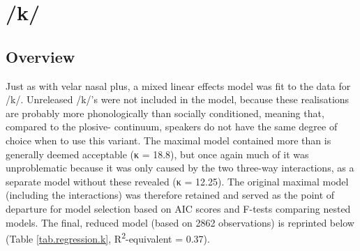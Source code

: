 \section{/k/}
\label{prod.res.con.k}

\subsection{Overview}
\label{sec.prod.res.con.k.overview}

Just as with velar nasal plus, a mixed linear effects model was fit to the data for /k/.
Unreleased /k/'s were not included in the model, because these realisations are probably more phonologically than socially conditioned, meaning that, compared to the plosive- continuum, speakers do not have the same degree of choice when to use this variant.
The maximal model contained more  than is generally deemed acceptable (κ = 18.8), but once again much of it was unproblematic because it was only caused by the two three-way interactions, as a separate model without these revealed (κ = 12.25).
The original maximal model (including the interactions) was therefore retained and served as the point of departure for model selection based on AIC scores and F-tests comparing nested models.
The final, reduced model (based on 2862 observations) is reprinted below (Table \ref{tab.regression.k}, R\textsuperscript{2}-equivalent = 0.37).

